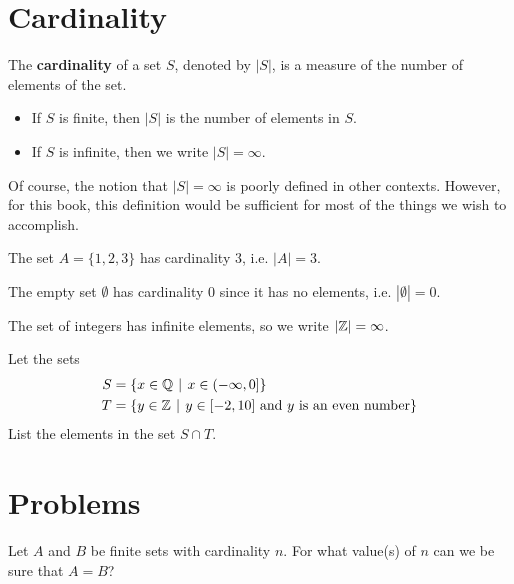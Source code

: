 \section{Cardinality}
\begin{definition}
    The \textbf{cardinality} of a set $S$, denoted by $|S|$, is a measure of the number of elements of the set.
    \begin{itemize}
        \item If $S$ is finite, then $|S|$ is the number of elements in $S$.
        \item If $S$ is infinite, then we write $|S| = \infty$.
    \end{itemize}
\end{definition}
\begin{remark}
    Of course, the notion that $|S| = \infty$ is poorly defined in other contexts. However, for this book, this definition would be sufficient for most of the things we wish to accomplish.
\end{remark}
\begin{example}
    The set $A = \{1, 2, 3\}$ has cardinality 3, i.e. $|A| = 3$.
\end{example}
\begin{example}
    The empty set $\emptyset$ has cardinality 0 since it has no elements, i.e. $|\emptyset| = 0$.
\end{example}
\begin{example}
    The set of integers has infinite elements, so we write $|\mathbb{Z}| = \infty$.
\end{example}

\begin{exercise}
    Let the sets
    \begin{align*}
        S &= \{x \in \Q \vert x \in (-\infty, 0]\}\\
        T &= \{y \in \Z \vert y \in [-2, 10] \text{ and } y \text{ is an even number} \}
    \end{align*}
    List the elements in the set $S \cap T$.
\end{exercise}

\newpage

\section{Problems}
\begin{problem}
    Let $A$ and $B$ be finite sets with cardinality $n$. For what value(s) of $n$ can we be sure that $A = B$?
\end{problem}

